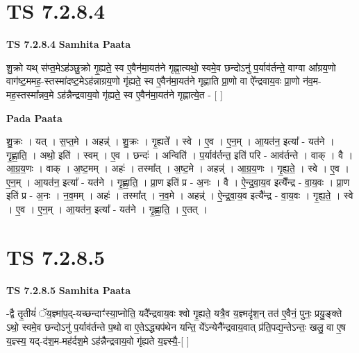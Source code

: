 \documentclass[17pt]{extarticle}
\begin{document}

\section{ TS 7.2.8.4 }

\textbf{TS 7.2.8.4 } \newline
\textbf{Samhita Paata} \newline

शु॒क्रो यथ् स॑प्त॒मेऽह॑ञ्छु॒क्रो गृ॒ह्यते॒ स्व ए॒वैन॑मा॒यत॑ने गृह्णा॒त्यथो॒ स्वमे॒व छन्दोऽनु॑ प॒र्याव॑र्तन्ते॒ वाग्वा आ᳚ग्रय॒णो वाग॑ष्ट॒ममह॒-स्तस्मा॑दष्ट॒मेऽह॑न्नाग्रय॒णो गृ॑ह्यते॒ स्व ए॒वैन॑मा॒यत॑ने गृह्णाति प्रा॒णो वा ऐ᳚न्द्रवाय॒वः प्रा॒णो न॑व॒म-मह॒स्तस्मा᳚न्नव॒मे ऽह॑न्नैन्द्रवाय॒वो गृ॑ह्यते॒ स्व ए॒वैन॑मा॒यत॑ने गृह्णात्ये॒त - [  ] \newline

\textbf{Pada Paata} \newline

शु॒क्रः । यत् । स॒प्त॒मे । अहन्न्॑ । शु॒क्रः । गृ॒ह्यते᳚ । स्वे । ए॒व । ए॒न॒म् । आ॒यत॑न॒ इत्या᳚ - यत॑ने । गृ॒ह्णा॒ति॒ । अथो॒ इति॑ । स्वम् । ए॒व । छन्दः॑ । अन्विति॑ । प॒र्याव॑र्तन्त॒ इति॑ परि - आव॑र्तन्ते । वाक् । वै । आ॒ग्र॒य॒णः । वाक् । अ॒ष्ट॒मम् । अहः॑ । तस्मा᳚त् । अ॒ष्ट॒मे । अहन्न्॑ । आ॒ग्र॒य॒णः । गृ॒ह्य॒ते॒ । स्वे । ए॒व । ए॒न॒म् । आ॒यत॑न॒ इत्या᳚ - यत॑ने । गृ॒ह्णा॒ति॒ । प्रा॒ण इति॑ प्र - अ॒नः । वै । ऐ॒न्द्र॒वा॒य॒व इत्यै᳚न्द्र - वा॒य॒वः । प्रा॒ण इति॑ प्र - अ॒नः । न॒व॒मम् । अहः॑ । तस्मा᳚त् । न॒व॒मे । अहन्न्॑ । ऐ॒न्द्र॒वा॒य॒व इत्यै᳚न्द्र - वा॒य॒वः । गृ॒ह्य॒ते॒ । स्वे । ए॒व । ए॒न॒म् । आ॒यत॑न॒ इत्या᳚ - यत॑ने । गृ॒ह्णा॒ति॒ । ए॒तत् ।  \newline





\section{ TS 7.2.8.5 }

\textbf{TS 7.2.8.5 } \newline
\textbf{Samhita Paata} \newline

-द्वै तृ॒तीयं॑ ॅय॒ज्ञ्मा॑प॒द्-यच्छन्दाꣳ॑स्या॒प्नोति॒ यदै᳚न्द्रवाय॒वः श्वो गृ॒ह्यते॒ यत्रै॒व य॒ज्ञ्मदृ॑श॒न् तत॑ ए॒वैनं॒ पुनः॒ प्रयु॒ङ्क्ते ऽथो॒ स्वमे॒व छन्दोऽनु॑ प॒र्याव॑र्तन्ते प॒थो वा ए॒तेऽद्ध्यप॑थेन यन्ति॒ ये᳚ऽन्येनै᳚न्द्रवाय॒वात् प्र॑ति॒पद्य॒न्तेऽन्तः॒ खलु॒ वा ए॒ष य॒ज्ञ्स्य॒ यद्-द॑श॒म-मह॑र्दश॒मे ऽह॑न्नैन्द्रवाय॒वो गृ॑ह्यते य॒ज्ञ्स्यै॒-[  ] \newline
\end{document}
